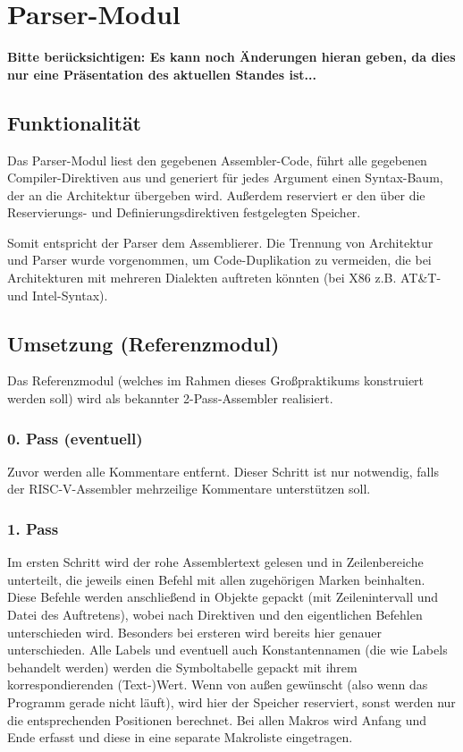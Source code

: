 \documentclass[a4paper]{article}
\begin{document}
\section{Parser-Modul}
\textbf{Bitte berücksichtigen: Es kann noch Änderungen hieran geben, da dies nur eine Präsentation des aktuellen Standes ist...}
\subsection{Funktionalität}
Das Parser-Modul liest den gegebenen Assembler-Code,
führt alle gegebenen Compiler-Direktiven aus und generiert für jedes Argument einen Syntax-Baum,
der an die Architektur übergeben wird.
Außerdem reserviert er den über die Reservierungs- und Definierungsdirektiven festgelegten Speicher.

Somit entspricht der Parser dem Assemblierer.
Die Trennung von Architektur und Parser wurde vorgenommen,
um Code-Duplikation zu vermeiden,
die bei Architekturen mit mehreren Dialekten auftreten könnten (bei X86 z.B. AT\&T- und Intel-Syntax).
\subsection{Umsetzung (Referenzmodul)}
Das Referenzmodul (welches im Rahmen dieses Großpraktikums konstruiert werden soll) wird als bekannter 2-Pass-Assembler realisiert.
\subsubsection{0. Pass (eventuell)}
Zuvor werden alle Kommentare entfernt. Dieser Schritt ist nur notwendig, falls der RISC-V-Assembler mehrzeilige Kommentare unterstützen soll.
\subsubsection{1. Pass}
Im ersten Schritt wird der rohe Assemblertext gelesen und in Zeilenbereiche unterteilt, die jeweils einen Befehl mit allen zugehörigen Marken beinhalten.
Diese Befehle werden anschließend in Objekte gepackt (mit Zeilenintervall und Datei des Auftretens), wobei nach Direktiven und den eigentlichen Befehlen unterschieden wird.
Besonders bei ersteren wird bereits hier genauer unterschieden.
Alle Labels und eventuell auch Konstantennamen (die wie Labels behandelt werden) werden die Symboltabelle gepackt mit ihrem korrespondierenden (Text-)Wert.
Wenn von außen gewünscht (also wenn das Programm gerade nicht läuft), wird hier der Speicher reserviert, sonst werden nur die entsprechenden Positionen berechnet.
Bei allen Makros wird Anfang und Ende erfasst und diese in eine separate Makroliste eingetragen.
\end{document}
